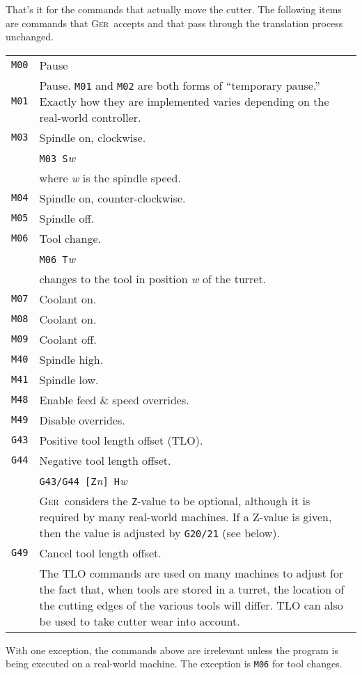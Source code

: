 \documentclass[titlepage,oneside,10pt]{article}
\newcommand{\ger}{\textsc{Ger}}
\begin{document}
That's it for the commands that actually move the cutter. The
following items are commands that \ger\ accepts and that pass through the
translation process unchanged.
\vskip 0.25cm
\begin{longtable}{lp{10cm}}
{\tt M00}& Pause\\
{\tt M01}& Pause. {\tt M01} and {\tt M02} are both forms of
``temporary pause.'' Exactly how they are implemented varies
depending on the real-world controller.\\
{\tt M03}&Spindle on, clockwise.\\
&         {\tt M03 S}\emph{w}\\
& where \emph{w} is the spindle speed.\\
{\tt M04}&Spindle on, counter-clockwise. \\
{\tt M05}&Spindle off.\\
{\tt M06}&Tool change.\\
& {\tt M06 T}\emph{w}\\
& changes to the tool in position \emph{w} of the turret. \\
{\tt M07}& Coolant on.\\
{\tt M08}& Coolant on.\\
{\tt M09}& Coolant off.\\
{\tt M40}& Spindle high.\\
{\tt M41}& Spindle low.\\
{\tt M48}& Enable feed \& speed overrides.\\
{\tt M49}& Disable overrides.\\
{\tt G43}&Positive tool length offset (TLO).\\
{\tt G44}&Negative tool length offset.\\
&{\tt G43/G44 [Z}\emph{n}{\tt ] H}\emph{w}\\
& \ger\ considers the {\tt Z}-value to be optional, although it is
required by many real-world machines. If a Z-value is given, then the
value is adjusted by {\tt G20/21} (see below).\\
{\tt G49}&Cancel tool length offset.\\
& The TLO commands are used on many machines to adjust for the 
fact that, when tools are stored in a turret, the location of the
cutting edges of the various tools will differ. TLO can also be used
to take cutter wear into account. 
\end{longtable}
With one exception, the commands above are irrelevant unless the
program is being executed on a real-world machine. The exception is
{\tt M06} for tool changes. 
\end{document}
